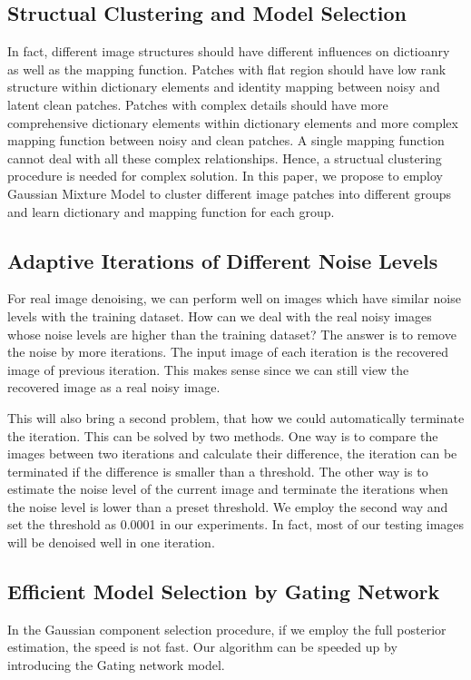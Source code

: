 \documentclass[10pt,twocolumn,letterpaper]{article}
\begin{document}
\subsection{Structual Clustering and Model Selection}
In fact, different image structures should have different influences on dictioanry as well as the mapping function. Patches with flat region should have low rank structure within dictionary elements and identity mapping between noisy and latent clean patches. Patches with complex details should have more comprehensive dictionary elements within dictionary elements and more complex mapping function between noisy and clean patches. A single mapping function cannot deal with all these complex relationships. Hence, a structual clustering procedure is needed for complex solution. In this paper, we propose to employ Gaussian Mixture Model to cluster different image patches into different groups and learn dictionary and mapping function for each group.

\subsection{Adaptive Iterations of Different Noise Levels}
For real image denoising, we can perform well on images which have similar noise levels with the training dataset. How can we deal with the real noisy images whose noise levels are higher than the training dataset? The answer is to remove the noise by more iterations. The input image of each iteration is the recovered image of previous iteration. This makes sense since we can still view the recovered image as a real noisy image. 

This will also bring a second problem, that how we could automatically terminate the iteration. This can be solved by two methods. One way is to compare the images between two iterations and calculate their difference, the iteration can be terminated if the difference is smaller than a threshold. The other way is to estimate the noise level of the current image and terminate the iterations when the noise level is lower than a preset threshold. We employ the second way and set the threshold as 0.0001 in our experiments. In fact, most of our testing images will be denoised well in one iteration.

\subsection{Efficient Model Selection by Gating Network}
In the Gaussian component selection procedure, if we employ the full posterior estimation, the speed is not fast. Our algorithm can be speeded up by introducing the Gating network model.
\end{document}
